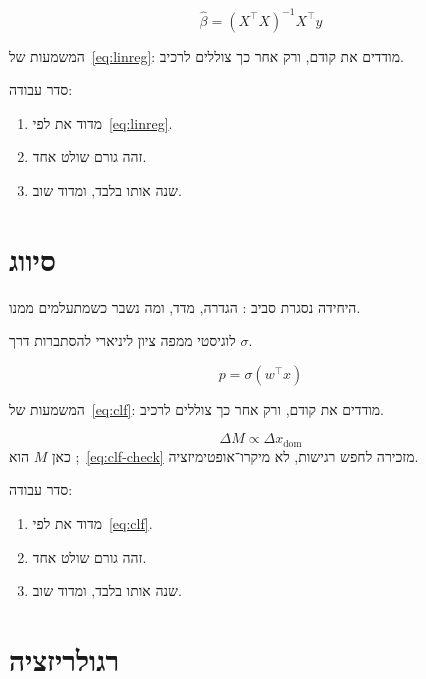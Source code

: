\begin{equation}
\label{eq:linreg}
\hat\beta=(X^\top X)^{-1}X^\top y
\end{equation}

המשמעות של~\eqref{eq:linreg}: מודדים את  קודם, ורק אחר כך צוללים לרכיב.

סדר עבודה:
\begin{enumerate}
\item[(\textbf{א})] מדוד את  לפי~\eqref{eq:linreg}.
\item[(\textbf{ב})] זהה גורם שולט אחד.
\item[(\textbf{ג})] שנה אותו בלבד, ומדוד שוב.
\end{enumerate}

\chapter{סיווג}
\label{ch:clf}

היחידה נסגרת סביב : הגדרה, מדד, ומה נשבר כשמתעלמים ממנו.

\begin{keybox}[frametitle={רעיון מפתח — סיווג}]
לוגיסטי ממפה ציון ליניארי להסתברות דרך $\sigma$.
\end{keybox}

\begin{equation}
\label{eq:clf}
p=\sigma(w^\top x)
\end{equation}

המשמעות של~\eqref{eq:clf}: מודדים את  קודם, ורק אחר כך צוללים לרכיב.

\begin{equation}
\label{eq:clf-check}
\Delta M \propto \Delta x_{\mathrm{dom}}
\end{equation}
כאן $M$ הוא ;~\eqref{eq:clf-check} מזכירה לחפש רגישות, לא מיקרו־אופטימיזציה.

סדר עבודה:
\begin{enumerate}
\item[(\textbf{א})] מדוד את  לפי~\eqref{eq:clf}.
\item[(\textbf{ב})] זהה גורם שולט אחד.
\item[(\textbf{ג})] שנה אותו בלבד, ומדוד שוב.
\end{enumerate}

\chapter{רגולריזציה}
\label{ch:reg}


